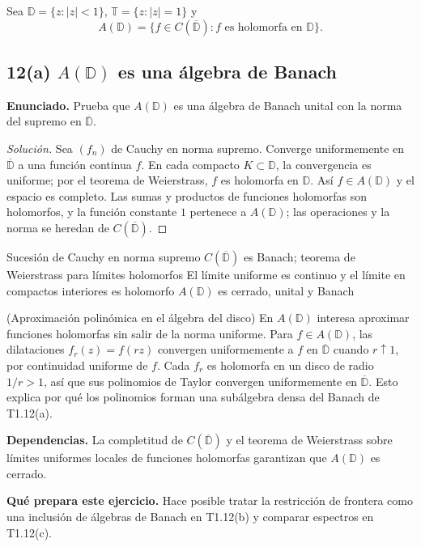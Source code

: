 Sea $\mathbb D=\{z:|z|<1\}$, $\mathbb T=\{z:|z|=1\}$ y
\[
 A(\mathbb D)=\{f\in C(\overline{\mathbb D}): f\text{ es holomorfa en }\mathbb D\}.
\]

\subsection*{12(a) $A(\mathbb D)$ es una álgebra de Banach}

\noindent\textbf{Enunciado.} Prueba que $A(\mathbb D)$ es una álgebra de Banach unital con la norma del supremo en $\overline{\mathbb D}$.

\begin{proof}[Solución]
Sea $(f_n)$ de Cauchy en norma supremo. Converge uniformemente en $\overline{\mathbb D}$ a una
función continua $f$. En cada compacto $K\subset\mathbb D$, la convergencia es uniforme; por el
teorema de Weierstrass, $f$ es holomorfa en $\mathbb D$. Así $f\in A(\mathbb D)$ y el espacio es
completo. Las sumas y productos de funciones holomorfas son holomorfos, y la función constante
$1$ pertenece a $A(\mathbb D)$; las operaciones y la norma se heredan de
$C(\overline{\mathbb D})$.
\end{proof}

\proofdiagram
{Sucesión de Cauchy en norma supremo}
{$C(\overline{\mathbb D})$ es Banach; teorema de Weierstrass para límites holomorfos}
{El límite uniforme es continuo y el límite en compactos interiores es holomorfo}
{$A(\mathbb D)$ es cerrado, unital y Banach}

\begin{cthejemplo}{(Aproximación polinómica en el álgebra del disco)}
En $A(\mathbb D)$ interesa aproximar funciones holomorfas sin salir de la norma uniforme.
Para $f\in A(\mathbb D)$, las dilataciones $f_r(z)=f(rz)$ convergen uniformemente a $f$
en $\overline{\mathbb D}$ cuando $r\uparrow1$, por continuidad uniforme de $f$.
Cada $f_r$ es holomorfa en un disco de radio $1/r>1$, así que sus polinomios de Taylor
convergen uniformemente en $\overline{\mathbb D}$.
Esto explica por qué los polinomios forman una subálgebra densa del Banach de T1.12(a).
\end{cthejemplo}

\noindent\textbf{Dependencias.} La completitud de $C(\overline{\mathbb D})$ y el teorema de Weierstrass sobre límites uniformes locales de funciones holomorfas garantizan que $A(\mathbb D)$ es cerrado.

\noindent\textbf{Qué prepara este ejercicio.} Hace posible tratar la restricción de frontera como una inclusión de álgebras de Banach en T1.12(b) y comparar espectros en T1.12(c).

